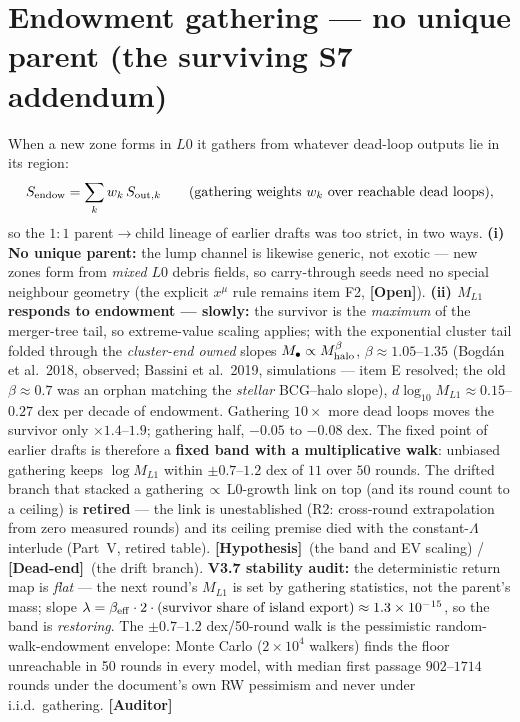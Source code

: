 \documentclass[11pt]{article}
\newcommand{\Hyp}{\textbf{\textcolor{blue!55!black}{[Hypothesis]}}}
\newcommand{\Dead}{\textbf{\textcolor{red!65!black}{[Dead-end]}}}
\newcommand{\Auditor}{\textbf{\textcolor{teal!55!black}{[Auditor]}}}
\newcommand{\open}{\textcolor{red!70!black}{\textbf{[Open]}}}
\begin{document}
\section{Endowment gathering --- no unique parent (the surviving S7 addendum)}
When a new zone forms in $L0$ it gathers from whatever dead-loop outputs lie in its region:
\[
S_{\rm endow}=\sum_k w_k\,S_{{\rm out},k}\qquad(\text{gathering weights }w_k\ \text{over reachable dead loops}),
\]
so the $1{:}1$ parent$\to$child lineage of earlier drafts was too strict, in two ways. \textbf{(i) No unique parent:} the lump channel is likewise generic, not exotic --- new zones form from \emph{mixed} $L0$ debris fields, so carry-through seeds need no special neighbour geometry (the explicit $x^\mu$ rule remains item F2, \open). \textbf{(ii) $M_{L1}$ responds to endowment --- slowly:} the survivor is the \emph{maximum} of the merger-tree tail, so extreme-value scaling applies; with the exponential cluster tail folded through the \emph{cluster-end owned} slopes $M_\bullet\propto M_{\rm halo}^{\beta}$, $\beta\approx1.05$--$1.35$ (Bogd\'an et al.\ 2018, observed; Bassini et al.\ 2019, simulations --- item E resolved; the old $\beta\approx0.7$ was an orphan matching the \emph{stellar} BCG--halo slope), $d\log_{10}M_{L1}\approx0.15$--$0.27$ dex per decade of endowment. Gathering $10\times$ more dead loops moves the survivor only $\times1.4$--$1.9$; gathering half, $-0.05$ to $-0.08$ dex. The fixed point of earlier drafts is therefore a \textbf{fixed band with a multiplicative walk}: unbiased gathering keeps $\log M_{L1}$ within $\pm0.7$--$1.2$ dex of $11$ over $50$ rounds. The drifted branch that stacked a gathering$\,\propto\,$L0-growth link on top (and its round count to a ceiling) is \textbf{retired} --- the link is unestablished (R2: cross-round extrapolation from zero measured rounds) and its ceiling premise died with the constant-$\Lambda$ interlude (Part~V, retired table). \Hyp\ (the band and EV scaling) / \Dead\ (the drift branch). \textbf{V3.7 stability audit:} the deterministic return map is \emph{flat} --- the next round's $M_{L1}$ is set by gathering statistics, not the parent's mass; slope $\lambda=\beta_{\rm eff}\cdot2\cdot(\text{survivor share of island export})\approx1.3\times10^{-15}$, so the band is \emph{restoring}. The $\pm0.7$--$1.2$ dex/50-round walk is the pessimistic random-walk-endowment envelope: Monte Carlo ($2\times10^4$ walkers) finds the floor unreachable in 50 rounds in every model, with median first passage $902$--$1714$ rounds under the document's own RW pessimism and never under i.i.d.\ gathering. \Auditor
\end{document}
